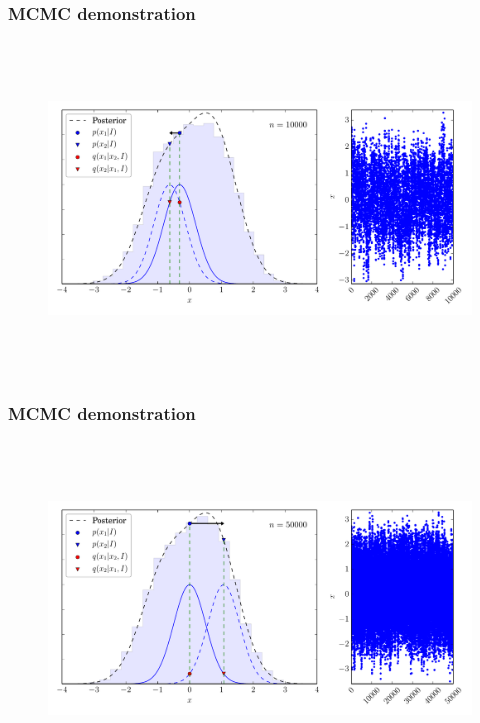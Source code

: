 \begin{frame}

\frametitle{MCMC demonstration}
\label{mcmcdemonstration}

\begin{figure}[htbp]
\centering
\includegraphics[keepaspectratio,width=\textwidth,height=250pt]{figures/mcmc_example_7.pdf}
\label{mcmc_example_7}
\end{figure}

\end{frame}

\begin{frame}

\frametitle{MCMC demonstration}
\label{mcmcdemonstration}

\begin{figure}[htbp]
\centering
\includegraphics[keepaspectratio,width=\textwidth,height=250pt]{figures/mcmc_example_8.pdf}
\label{mcmc_example_8}
\end{figure}

\end{frame}

